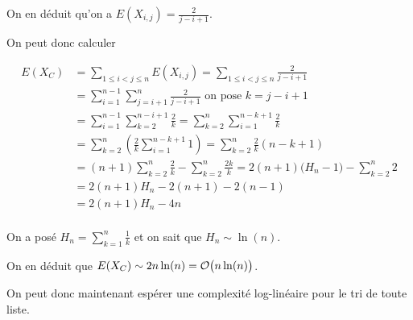 On en déduit qu'on a $\displaystyle E(X_{i, j}) = \frac 2{j-i+1}$. 

On peut donc calculer

\begin{align*}
    E(X_C) 
    &= \sum_{1\le i< j \le n} E(X_{i, j})
     = \sum_{1\le i< j \le n} \frac 2{j-i+1}\\
    &= \sum_{i = 1}^{n-1}\sum_{j = i+1}^n \frac 2{j-i+1} \text{ on pose } k = j-i+1\\
    &= \sum_{i = 1}^{n-1}\sum_{k=2}^{n-i+1} \frac 2k
     = \sum_{k = 2}^n\sum_{i = 1}^{n-k+1} \frac 2k\\
    &= \sum_{k = 2}^n\left(\frac 2k \sum_{i = 1}^{n-k+1} 1\right)
     = \sum_{k = 2}^n \frac 2k (n-k+1)\\
    &= (n+1)\sum_{k = 2}^n \frac 2k - \sum_{k = 2}^n \frac {2k}k
     = 2(n+1)\bigl(H_n-1) - \sum_{k = 2}^n 2\\
    &= 2(n+1)H_n -2(n+1) - 2(n-1)\\ 
    &= 2(n+1)H_n - 4n\\
\end{align*}

On a posé $\displaystyle H_n =\sum_{k=1}^n \frac 1k$ et on sait que $H_n\sim \ln(n)$.

On en déduit que $E(X_C)\sim2n\ln(n)={\cal O}\bigl(n\ln(n)\bigr)$.

On peut donc maintenant espérer une complexité log-linéaire pour le tri de toute liste.





